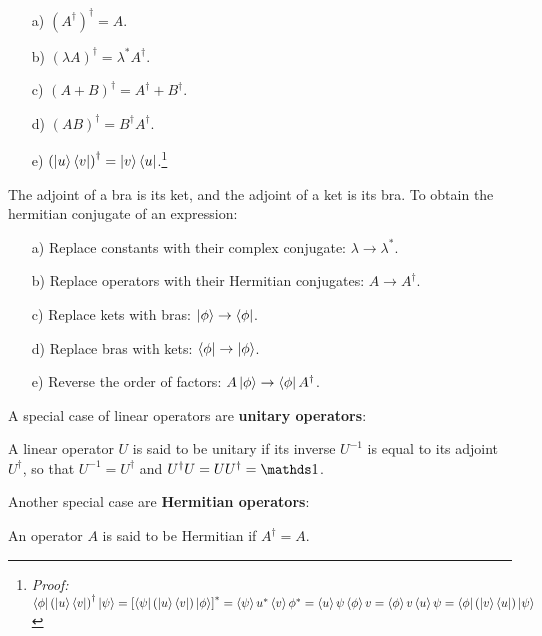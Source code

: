 \begin{itemize}
    \begin{enumerate}
        \item[a)] $\left(A^\dagger\right)^\dagger = A$.
        \item[b)] $\left(\lambda A\right)^\dagger = \lambda^*A^\dagger$.
        \item[c)] $\left(A + B\right)^\dagger = A^\dagger + B^\dagger$.
        \item[d)] $\left(A B\right)^\dagger = B^\dagger A^\dagger$.
        \item [e)] $\left(\ket{u}\bra{v}\right)^\dagger = \ket{v}\bra{u}$.\footnote{\textit{Proof:} $\bra{\phi}\left(\ket{u}\bra{v}\right)^\dagger\ket{\psi} = \left[\bra{\psi}\left(\ket{u}\bra{v}\right)\ket{\phi}\right]^* = \braket{\psi}{u}^*\braket{v}{\phi}^* = \braket{u}{\psi}\braket{\phi}{v} = \braket{\phi}{v}\braket{u}{\psi} = \bra{\phi}\left(\ket{v}\bra{u}\right)\ket{\psi}$}
    \end{enumerate}
    The adjoint of a bra is its ket, and the adjoint of a ket is its bra.
    To obtain the hermitian conjugate of an expression:
    \begin{enumerate}
        \item[a)] Replace constants with their complex conjugate: $\lambda \to \lambda^*$.
        \item[b)] Replace operators with their Hermitian conjugates: $A\to A^\dagger$.
        \item[c)] Replace kets with bras: $\ket{\phi}\to\bra{\phi}$.
        \item[d)] Replace bras with kets: $\bra{\phi}\to\ket{\phi}$.
        \item[e)] Reverse the order of factors: $A\ket{\phi} \to \bra{\phi}A^\dagger$.

    \end{enumerate}
\end{itemize}

A special case of linear operators are \textbf{unitary operators}:

\begin{definition}
    A linear operator $U$ is said to be unitary if its inverse $U^{-1}$ is equal to its adjoint $U^\dagger$, so that $U^{-1} = U^\dagger$ and $U^\dagger U = UU^\dagger = \Imat$.
\end{definition}

Another special case are \textbf{Hermitian operators}:

\begin{definition}
    An operator $A$ is said to be Hermitian if $A^\dagger = A$.
\end{definition}

